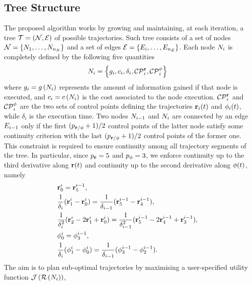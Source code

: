 \subsection{Tree Structure}%
\label{SEC:EXPLORATION-TREE-STRUCTURE}
The proposed algorithm works by growing and maintaining, at each iteration, a tree $\mathcal{T} = \left( \mathcal{N}, \mathcal{E} \right)$ of possible trajectories.
Such tree consists of a set of nodes $\mathcal{N} = \{N_1, \dots, N_{n_{N}}\}$ and a set of edges
$\mathcal{E} = \{E_i, \dots , E_{n_{E}}\}$. Each node $N_i$ is completely defined by the following five quantities
\begin{equation*}
	N_i = \left\{ g_i, c_i, \delta_i, \mathcal{CP}^{\mathbf{r}}_i, \mathcal{CP}^{\phi}_i \right\}
\end{equation*}
where $g_i = g \left( N_i \right)$ represents the amount of information gained if that node is executed, and $c_i = c \left( N_i \right)$
is the cost associated to the node execution. $\mathcal{CP}^{\mathbf{r}}_i$ and $\mathcal{CP}^{\phi}_i$ are the two sets of control points defining the
trajectories $\mathbf{r}_i(t)$ and $\phi_i(t)$, while $\delta_i$ is the execution time. Two nodes $N_{i-1}$ and $N_{i}$ are connected
by an edge $E_{i-1}$ only if the first $(p_{\mathbf{r}/\phi}+1)/2$ control points of the latter node satisfy some continuity criterion with
the last $(p_{\mathbf{r}/\phi}+1)/2$ control points of the former one. This constraint is required to ensure continuity among all trajectory
segments of the tree. In particular, since $p_{\mathbf{r}} = 5$ and $p_{\phi} = 3$, we enforce continuity up to the third derivative along
$\mathbf{r}(t)$ and continuity up to the second derivative along $\phi(t)$, namely
\begin{align}
	\label{EQ:EXPLORATION-FIRST-COND}
	&\mathbf{r}^{i}_0  = \mathbf{r}^{i-1}_5,\\
	\label{EQ:EXPLORATION-SECOND-COND}
	&\frac{1}{\delta_{i}}(\mathbf{r}^{i}_1 - \mathbf{r}^{i}_0)  = \frac{1}{\delta_{i-1}}(\mathbf{r}^{i-1}_5 - \mathbf{r}^{i-1}_4),\\
	\label{EQ:EXPLORATION-THIRD-COND}
	&\frac{1}{\delta_{i}^2}(\mathbf{r}^{i}_2 - 2\mathbf{r}^{i}_1 + \mathbf{r}^{i}_0)  = \frac{1}{\delta_{i-1}^2}(\mathbf{r}^{i-1}_5 - 2\mathbf{r}^{i-1}_4 + \mathbf{r}^{i-1}_3),\\
	\label{EQ:EXPLORATION-FOURTH-COND}
	&\phi^{i}_0  = \phi^{i-1}_3,\\
	\label{EQ:EXPLORATION-FIFTH-COND}
	&\frac{1}{\delta_{i}}(\phi^{i}_1 - \phi^{i}_0)  = \frac{1}{\delta_{i-1}}(\phi^{i-1}_3 - \phi^{i-1}_2).
\end{align}
The aim is to plan sub-optimal trajectories by maximising a user-specified utility function $\mathcal{J} \left( \mathcal{R} \left( N_i \right) \right)$,
